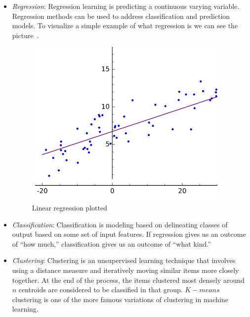 \begin{itemize}
	\item \textit{Regression}: Regression learning is predicting a continuous varying variable. Regression methods can be used to address classification and prediction models. To visualize a simple example of what regression is we can see the picture~.
	\begin{figure}
		\centering
		\includegraphics[scale=1.6]{img/regression.png}
		\caption{Linear regression plotted~\cite{tfidf}}
		\label{fig:regresion}
	\end{figure}
	\item \textit{Classification}: Classification is modeling based on delineating classes of output based on some set of input features. If regression gives us an outcome of ``how much,” classification gives us an outcome of ``what kind.”
	\item \textit{Clustering}: Clustering is an unsupervised learning technique that involves using a distance measure and iteratively moving similar items more closely together. At the end of the process, the items clustered most densely around $n$ centroids are considered to be classified in that group. $K-means$ clustering is one of the more famous variations of clustering in machine learning. 
\end{itemize} 

